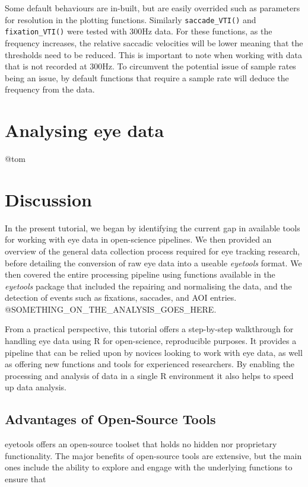 \documentclass[
  man,
  floatsintext,
  longtable,
  nolmodern,
  notxfonts,
  notimes,
  colorlinks=true,linkcolor=blue,citecolor=blue,urlcolor=blue]{apa7}
\begin{document}
Some default behaviours are in-built, but are easily overrided such as
parameters for resolution in the plotting functions. Similarly
\texttt{saccade\_VTI()} and \texttt{fixation\_VTI()} were tested with
300Hz data. For these functions, as the frequency increases, the
relative saccadic velocities will be lower meaning that the thresholds
need to be reduced. This is important to note when working with data
that is not recorded at 300Hz. To circumvent the potential issue of
sample rates being an issue, by default functions that require a sample
rate will deduce the frequency from the data.

\section{Analysing eye data}\label{analysing-eye-data}

@tom

\section{Discussion}\label{discussion}

In the present tutorial, we began by identifying the current gap in
available tools for working with eye data in open-science pipelines. We
then provided an overview of the general data collection process
required for eye tracking research, before detailing the conversion of
raw eye data into a useable \emph{eyetools} format. We then covered the
entire processing pipeline using functions available in the
\emph{eyetools} package that included the repairing and normalising the
data, and the detection of events such as fixations, saccades, and AOI
entries. @SOMETHING\_ON\_THE\_ANALYSIS\_GOES\_HERE.

From a practical perspective, this tutorial offers a step-by-step
walkthrough for handling eye data using R for open-science, reproducible
purposes. It provides a pipeline that can be relied upon by novices
looking to work with eye data, as well as offering new functions and
tools for experienced researchers. By enabling the processing and
analysis of data in a single R environment it also helps to speed up
data analysis.

\subsection{Advantages of Open-Source
Tools}\label{advantages-of-open-source-tools}

eyetools offers an open-source toolset that holds no hidden nor
proprietary functionality. The major benefits of open-source tools are
extensive, but the main ones include the ability to explore and engage
with the underlying functions to ensure that
\end{document}
